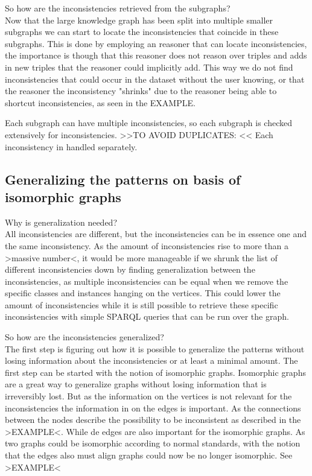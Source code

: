 \documentclass{article}
\begin{document}
So how are the inconsistencies retrieved from the subgraphs?\\
Now that the large knowledge graph has been split into multiple smaller subgraphs we can start to locate the inconsistencies that coincide in these subgraphs. This is done by employing an reasoner that can locate inconsistencies, the importance is though that this reasoner does not reason over triples and adds in new triples that the reasoner could implicitly add. This way we do not find inconsistencies that could occur in the dataset without the user knowing, or that the reasoner the inconsistency "shrinks" due to the reasoner being able to shortcut inconsistencies, as seen in the EXAMPLE.


Each subgraph can have multiple inconsistencies, so each subgraph is checked extensively for inconsistencies.  >>TO AVOID DUPLICATES: << Each inconsistency in handled separately.


\subsection{Generalizing the patterns on basis of isomorphic graphs}
Why is generalization needed?\\
All inconsistencies are different, but the inconsistencies can be in essence one and the same inconsistency. As the amount of inconsistencies rise to more than a >massive number<, it would be more manageable if we shrunk the list of different inconsistencies down by finding generalization between the inconsistencies, as multiple inconsistencies can be equal when we remove the specific classes and instances hanging on the vertices. This could lower the amount of inconsistencies while it is still possible to retrieve these specific inconsistencies with simple SPARQL queries that can be run over the graph. 

So how are the inconsistencies generalized?\\
The first step is figuring out how it is possible to generalize the patterns without losing information about the inconsistencies or at least a minimal amount. The first step can be started with the notion of isomorphic graphs. Isomorphic graphs are a great way to generalize graphs without losing information that is irreversibly lost. But as the information on the vertices is not relevant for the inconsistencies the information in on the edges is important. As the connections between the nodes describe the possibility to be inconsistent as described in the >EXAMPLE<. While de edges are also important for the isomorphic graphs. As two graphs could be isomorphic according to normal standards, with the notion that the edges also must align graphs could now be no longer isomorphic. See >EXAMPLE<
\end{document}
